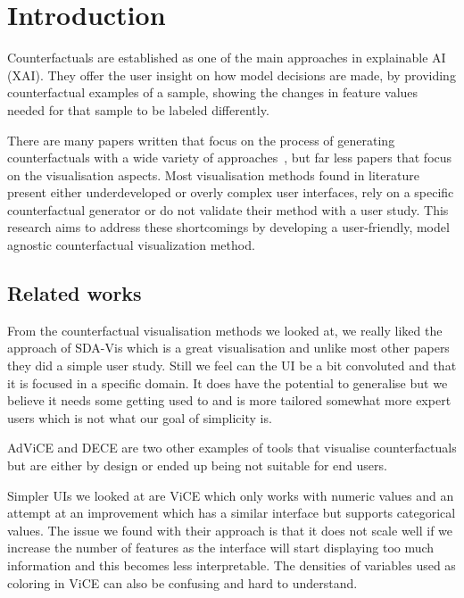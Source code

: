 \section*{Introduction}
Counterfactuals are established as one of the main approaches in explainable AI (XAI). They offer the user insight on how model decisions are made, by providing counterfactual examples of a sample, showing the changes in feature values needed for that sample to be labeled differently. 


There are many papers written that focus on the process of generating counterfactuals with a wide variety of approaches~\cite{keane2020good}, but far less papers that focus on the visualisation aspects. Most visualisation methods found in literature present either underdeveloped or overly complex user interfaces, rely on a specific counterfactual generator or do not validate their method with a user study. This research aims to address these shortcomings by developing a user-friendly, model agnostic counterfactual visualization method.

\subsection*{Related works}
From the counterfactual visualisation methods we looked at, we really liked the approach of SDA-Vis \cite{garcia2022sda} which is a great visualisation and unlike most other papers they did a simple user study. Still we feel can the UI be a bit convoluted and that it is focused in a specific domain. It does have the potential to generalise but we believe it needs some getting used to and is more tailored somewhat more expert users which is not what our goal of simplicity is. 

AdViCE \cite{gomez2021advice} and DECE \cite{cheng2020dece} are two other examples of tools that visualise counterfactuals but are either by design or ended up being not suitable for end users.

Simpler UIs we looked at are ViCE \cite{gomez2020vice} which only works with numeric values and an attempt at an improvement \cite{guyomard2023interactive} which has a similar interface but supports categorical values. The issue we found with their approach is that it does not scale well if we increase the number of features as the interface will start displaying too much information and this becomes less interpretable. The densities of variables used as coloring in ViCE can also be confusing and hard to understand. 

